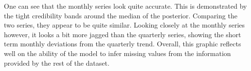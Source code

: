 One can see that the monthly series look quite accurate. This is demonstrated by the tight credibility bands around the median of the posterior. Comparing the two series, they appear to be quite similar. Looking closely at the monthly series however, it looks a bit more jagged than the quarterly series, showing the short term monthly deviations from the quarterly trend. Overall, this graphic reflects well on the ability of the model to infer missing values from the information provided by the rest of the dataset.

\newpage
